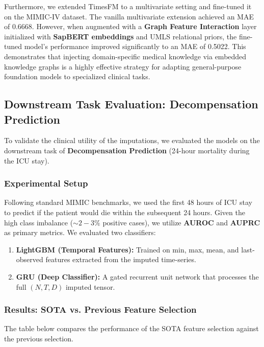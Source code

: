 Furthermore, we extended TimesFM to a multivariate setting and fine-tuned it on the MIMIC-IV dataset. The vanilla multivariate extension achieved an MAE of 0.6668. However, when augmented with a \textbf{Graph Feature Interaction} layer initialized with \textbf{SapBERT embeddings} and UMLS relational priors, the fine-tuned model's performance improved significantly to an MAE of 0.5022. This demonstrates that injecting domain-specific medical knowledge via embedded knowledge graphs is a highly effective strategy for adapting general-purpose foundation models to specialized clinical tasks.

\subsection{Downstream Task Evaluation: Decompensation Prediction}
To validate the clinical utility of the imputations, we evaluated the models on the downstream task of \textbf{Decompensation Prediction} (24-hour mortality during the ICU stay). 

\subsubsection{Experimental Setup}
Following standard MIMIC benchmarks, we used the first 48 hours of ICU stay to predict if the patient would die within the subsequent 24 hours. Given the high class imbalance ($\sim 2-3\%$ positive cases), we utilize \textbf{AUROC} and \textbf{AUPRC} as primary metrics. We evaluated two classifiers:
\begin{enumerate}
    \item \textbf{LightGBM (Temporal Features):} Trained on min, max, mean, and last-observed features extracted from the imputed time-series.
    \item \textbf{GRU (Deep Classifier):} A gated recurrent unit network that processes the full $(N, T, D)$ imputed tensor.
\end{enumerate}

\subsubsection{Results: SOTA vs. Previous Feature Selection}
The table below compares the performance of the SOTA feature selection against the previous selection.

